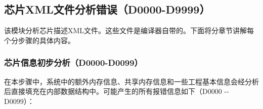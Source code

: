 \newpage
\subsection{芯片XML文件分析错误（D0000-D9999）}\label{subsec:5-6-3}

该模块分析芯片描述XML文件。这些文件是编译器自带的。下面将分章节讲解每个分步骤的具体内容。

\subsubsection{芯片信息初步分析（D0000-D0099）}\label{subsubsec:5-6-3-1}

在本步骤中，系统中的额外内存信息、共享内存信息和一些工程基本信息会经分析后直接填充在内部数据结构中。可能产生的所有报错信息如下（D0000
-\/- D0099）：

